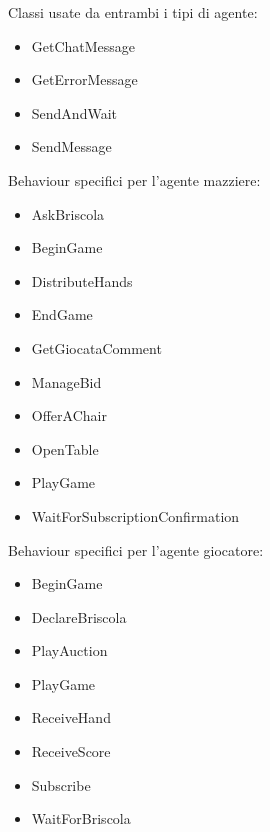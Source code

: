 \documentclass[runningheads,a4paper]{llncs}
\begin{document}
Classi usate da entrambi i tipi di agente:
\begin{itemize}
   \item GetChatMessage
   \item GetErrorMessage
   \item SendAndWait
   \item SendMessage
\end{itemize}

Behaviour specifici per l'agente mazziere:

\begin{itemize}
   \item AskBriscola
   \item BeginGame
   \item DistributeHands
   \item EndGame
   \item GetGiocataComment
   \item ManageBid
   \item OfferAChair
   \item OpenTable
   \item PlayGame
   \item WaitForSubscriptionConfirmation
\end{itemize}

Behaviour specifici per l'agente giocatore:

\begin{itemize}
   \item BeginGame
   \item DeclareBriscola
   \item PlayAuction
   \item PlayGame
   \item ReceiveHand
   \item ReceiveScore
   \item Subscribe
   \item WaitForBriscola
\end{itemize}
\end{document}
